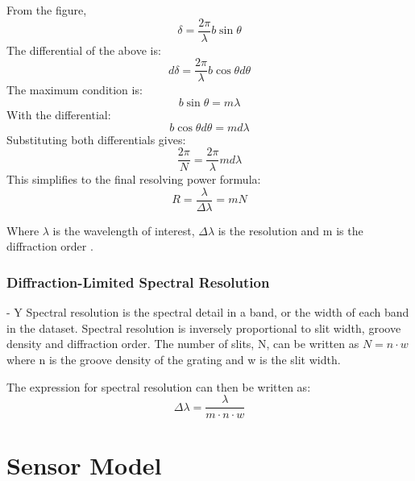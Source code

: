 From the figure, 
\begin{equation}
\delta = \frac{2\pi}{\lambda}b\sin{\theta}
\end{equation}
The differential of the above is: 
\begin{equation}
d\delta = \frac{2\pi}{\lambda}b\cos{\theta}d\theta
\end{equation}
The maximum condition is:
\begin{equation}
b\sin{\theta} = m\lambda
\end{equation}
With the differential:
\begin{equation}
b\cos{\theta}d\theta = md\lambda
\end{equation}
Substituting both differentials gives:
\begin{equation}
\frac{2\pi}{N} = \frac{2\pi}{\lambda}md\lambda
\end{equation}
This simplifies to the final resolving power formula:
\begin{equation}
\boxed{R = \frac{\lambda}{\Delta \lambda} = mN}
\end{equation}

Where $\lambda$ is the wavelength of interest, $\Delta \lambda$ is the resolution and m is the diffraction order \cite{Hyperphysics}. 





\subsubsection{Diffraction-Limited Spectral Resolution} - Y 
Spectral resolution is the spectral detail in a band, or the width of each band in the dataset. Spectral resolution is inversely proportional to slit width, groove density and diffraction order. The number of slits, N, can be written as  $N = n\cdot w$ where n is the groove density of the grating and w is the slit width.

The expression for spectral resolution can then be written as:
\begin{equation}
\boxed{\Delta \lambda = \frac{\lambda}{m\cdot n\cdot w}}
\end{equation}

\section{Sensor Model}

